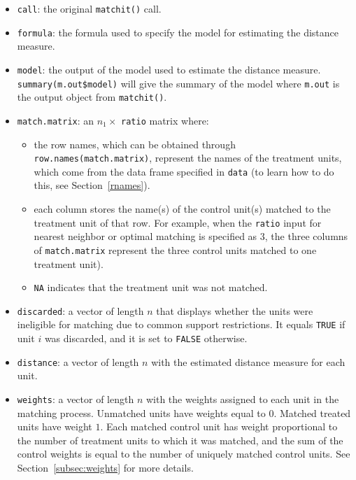 \begin{itemize}
\item \texttt{call}: the original {\tt matchit()} call.
  
\item \texttt{formula}: the formula used to specify the model for
  estimating the distance measure.
  
\item \texttt{model}: the output of the model used to estimate
  the distance measure.  \texttt{summary(m.out\$model)} will give the
  summary of the model where \texttt{m.out} is the output object from
  \texttt{matchit()}.
  
\item \texttt{match.matrix}: an $n_1 \times$ \texttt{ratio} matrix
  where:
  \begin{itemize}
  \item the row names, which can be obtained through
    \texttt{row.names(match.matrix)}, represent the names of the
    treatment units, which come from the data frame specified in
    \texttt{data} (to learn how to do this, see Section~\ref{rnames}).
  \item each column stores the name(s) of the control unit(s) matched
    to the treatment unit of that row. For example, when the
    \texttt{ratio} input for nearest neighbor or optimal matching is
    specified as 3, the three columns of \texttt{match.matrix}
    represent the three control units matched to one treatment unit).
  \item \texttt{NA} indicates that the treatment unit was not matched.
  \end{itemize}

\item \texttt{discarded}: a vector of length $n$ that displays
  whether the units were ineligible for matching due to common support
  restrictions.  It equals \texttt{TRUE} if unit $i$ was discarded,
  and it is set to \texttt{FALSE} otherwise.
  
\item \texttt{distance}: a vector of length $n$ with the estimated
  distance measure for each unit.
  
\item \texttt{weights}: a vector of length $n$ with the
  weights assigned to each unit in the matching process.  Unmatched
  units have weights equal to $0$. Matched treated units have weight
  $1$.  Each matched control unit has weight proportional to the
  number of treatment units to which it was matched, and the sum of
  the control weights is equal to the number of uniquely matched
  control units. See Section~\ref{subsec:weights} for more details.
  

\end{itemize}
